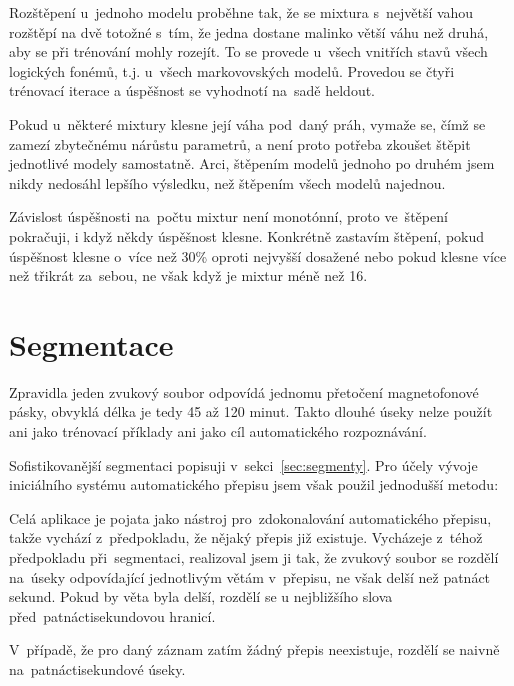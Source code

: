 \begin{enumerate}
Rozštěpení u~jednoho modelu proběhne tak, že se mixtura s~největší vahou
rozštěpí na dvě totožné s~tím, že jedna dostane malinko větší váhu než druhá, aby se
při trénování mohly rozejít. To se provede u~všech vnitřích stavů všech
logických fonémů, t.j. u~všech markovovských modelů. Provedou se čtyři trénovací
iterace a úspěšnost se vyhodnotí na~sadě heldout.

Pokud u~některé mixtury klesne její váha pod~daný práh, vymaže se, čímž se
zamezí zbytečnému nárůstu parametrů, a není proto potřeba zkoušet štěpit
jednotlivé modely samostatně. Arci, štěpením modelů jednoho po druhém jsem nikdy nedosáhl lepšího
výsledku, než štěpením všech modelů najednou.

Závislost úspěšnosti na~počtu mixtur není monotónní, proto ve~štěpení pokračuji,
i když někdy úspěšnost klesne. Konkrétně zastavím štěpení, pokud úspěšnost
klesne o~více než 30\% oproti nejvyšší dosažené nebo pokud klesne více než
třikrát za~sebou, ne však když je mixtur méně než 16.


\end{enumerate}

\section{Segmentace}

Zpravidla jeden zvukový soubor odpovídá jednomu přetočení magnetofonové pásky,
obvyklá délka je tedy 45 až 120 minut. Takto dlouhé úseky nelze použít ani jako
trénovací příklady ani jako cíl automatického rozpoznávání.

Sofistikovanější segmentaci popisuji v~sekci~\ref{sec:segmenty}. Pro účely
vývoje iniciálního systému automatického přepisu jsem však použil jednodušší
metodu:

Celá aplikace je pojata jako nástroj pro~zdokonalování automatického přepisu,
takže vychází z~předpokladu, že nějaký přepis již existuje. Vycházeje z~téhož
předpokladu při~segmentaci, realizoval jsem ji tak, že zvukový soubor se rozdělí
na~úseky odpovídající jednotlivým větám v~přepisu, ne však delší než patnáct
sekund. Pokud by věta byla delší, rozdělí se u nejbližšího slova
před~patnáctisekundovou hranicí.

V~případě, že pro daný záznam zatím žádný přepis neexistuje, rozdělí se naivně
na~patnáctisekundové úseky.

